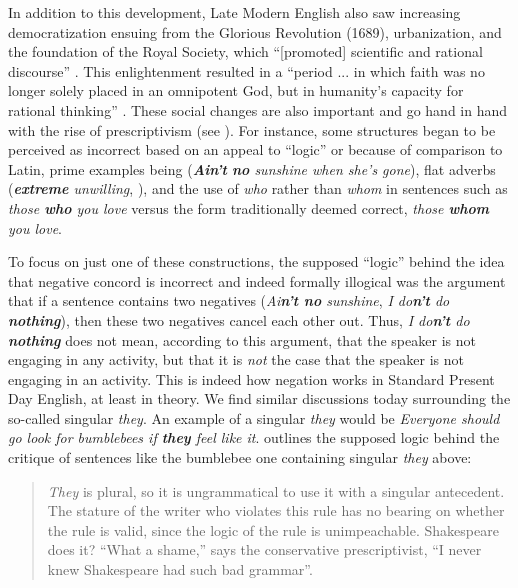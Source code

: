 In addition to this development, Late Modern English also saw increasing democratization ensuing from the Glorious Revolution (1689), urbanization, and the foundation of the Royal Society, which ``{[}promoted{]} scientific and rational discourse'' \citep[3]{Beal2004}. This enlightenment resulted in a ``period ... in which faith was no longer solely placed in an omnipotent God, but in humanity's capacity for rational thinking'' \citep[3]{Beal2004}. These social changes are also important and go hand in hand with the rise of prescriptivism (see ). For instance, some structures began to be perceived as incorrect based on an appeal to ``logic'' or because of comparison to Latin, prime examples being  (\textit{\textbf{Ain't} \textbf{no} sunshine when she's gone}), flat adverbs (\textit{\textbf{extreme} unwilling}, \citealp[11]{Mugglestone2003}), and the use of \textit{who} rather than \textit{whom} in sentences such as \textit{those \textbf{who} you love} versus the form traditionally deemed correct, \textit{those \textbf{whom} you love}.

To focus on just one of these constructions, the supposed ``logic'' behind the idea that negative concord is incorrect and indeed formally illogical was the argument that if a sentence contains two negatives (\textit{Ai\textbf{n't no} sunshine}, \textit{I do\textbf{n't} do \textbf{nothing}}), then these two negatives cancel each other out. Thus, \textit{I do\textbf{n't} do \textbf{nothing}} does not mean, according to this argument, that the speaker is not engaging in any activity, but that it is \textit{not} the case that the speaker is not engaging in an activity. This is indeed how negation works in Standard Present Day English, at least in theory. We find similar discussions today surrounding the so-called singular \textit{they}. An example of a singular \textit{they} would be \textit{Everyone should go look for bumblebees if \textbf{they} feel like it}. \citet[273]{Boyd2019} outlines the supposed logic behind the critique of sentences like the bumblebee one containing singular \textit{they} above:

\begin{quote}
    \textit{They} is plural, so it is ungrammatical to use it with a singular antecedent. The stature of the writer who violates this rule has no bearing on whether the rule is valid, since the logic of the rule is unimpeachable. Shakespeare does it? ``What a shame,'' says the conservative prescriptivist, ``I never knew Shakespeare had such bad grammar''.
\end{quote}

